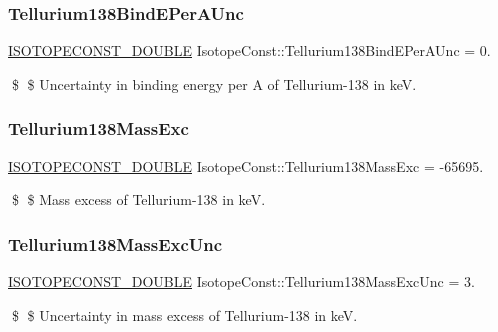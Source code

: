 \subsubsection{\texorpdfstring{Tellurium138\+Bind\+E\+Per\+A\+Unc}{Tellurium138BindEPerAUnc}}
{\footnotesize\ttfamily \mbox{\hyperlink{group___isotope_const-_macros_ga8f45a7272ce02c0b4c65c44636ed719a}{I\+S\+O\+T\+O\+P\+E\+C\+O\+N\+S\+T\+\_\+\+D\+O\+U\+B\+LE}} Isotope\+Const\+::\+Tellurium138\+Bind\+E\+Per\+A\+Unc = 0.}

\$ \$ Uncertainty in binding energy per A of Tellurium-\/138 in keV. \mbox{\label{group___isotope_const-_tellurium-_te138_gafc2540e058e22eadbe49437291ccd0b4}} 
\subsubsection{\texorpdfstring{Tellurium138\+Mass\+Exc}{Tellurium138MassExc}}
{\footnotesize\ttfamily \mbox{\hyperlink{group___isotope_const-_macros_ga8f45a7272ce02c0b4c65c44636ed719a}{I\+S\+O\+T\+O\+P\+E\+C\+O\+N\+S\+T\+\_\+\+D\+O\+U\+B\+LE}} Isotope\+Const\+::\+Tellurium138\+Mass\+Exc = -\/65695.}

\$ \$ Mass excess of Tellurium-\/138 in keV. \mbox{\label{group___isotope_const-_tellurium-_te138_gab69ce9b926ef29d5c8fe11cfee01cfd9}} 
\subsubsection{\texorpdfstring{Tellurium138\+Mass\+Exc\+Unc}{Tellurium138MassExcUnc}}
{\footnotesize\ttfamily \mbox{\hyperlink{group___isotope_const-_macros_ga8f45a7272ce02c0b4c65c44636ed719a}{I\+S\+O\+T\+O\+P\+E\+C\+O\+N\+S\+T\+\_\+\+D\+O\+U\+B\+LE}} Isotope\+Const\+::\+Tellurium138\+Mass\+Exc\+Unc = 3.}

\$ \$ Uncertainty in mass excess of Tellurium-\/138 in keV. \mbox{\label{group___isotope_const-_tellurium-_te138_ga9e3af60d284ef51f34efcfef036fa589}} 
